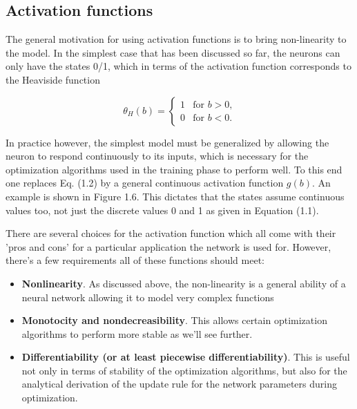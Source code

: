 \subsection{Activation functions}

The general motivation for using activation functions is to bring non-linearity to the model. In the simplest case that has been discussed so far, the neurons can only have the states 0/1, which in terms of the activation function corresponds to the Heaviside function

$$ 
\theta_H(b) = 
\begin{cases}	
1 & \text{for $b > 0$,}\\
0 & \text{for $b < 0$.}
\end{cases} 
$$

In practice however, the simplest model must be generalized by allowing the neuron to respond continuously to its inputs, which is necessary for the optimization algorithms used in the training phase to perform well. To this end one replaces Eq. (1.2) by a general continuous activation function $ g(b) $. An example is shown in Figure 1.6. This dictates that the states assume continuous values too, not just the discrete values 0 and 1 as given in Equation (1.1).

There are several choices for the activation function which all come with their 'pros and cons' for a particular application the network is used for. However, there's a few requirements all of these functions should meet:

\begin{itemize}
	
\item \textbf{Nonlinearity}. As discussed above, the non-linearity is a general ability of a neural network allowing it to model very complex functions
\item \textbf{Monotocity and nondecreasibility}. This allows certain optimization algorithms to perform more stable as we'll see further.
\item \textbf{Differentiability (or at least piecewise differentiability)}. This is useful not only in terms of stability of the optimization algorithms, but also for the analytical derivation of the update rule for the network parameters during optimization. 
		
\end{itemize}

